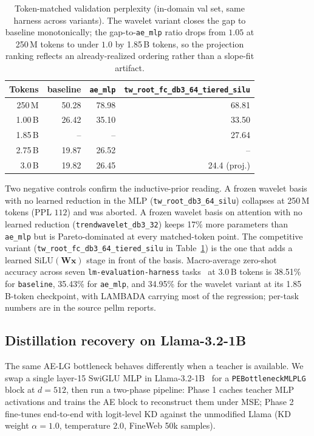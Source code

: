 \documentclass{article}
\begin{document}
\begin{table}[h]
  \caption{Token-matched validation perplexity (in-domain val set, same harness across variants). The wavelet variant closes the gap to baseline monotonically; the gap-to-\texttt{ae\_mlp} ratio drops from $1.05$ at 250\,M tokens to under $1.0$ by 1.85\,B tokens, so the projection ranking reflects an already-realized ordering rather than a slope-fit artifact.}
  \label{tab:llm_trajectory}
  \centering
  \begin{tabular}{rrrr}
    \toprule
    Tokens & baseline & \texttt{ae\_mlp} & \texttt{tw\_root\_fc\_db3\_64\_tiered\_silu} \\
    \midrule
    250\,M  & 50.28 & 78.98 & 68.81 \\
    1.00\,B & 26.42 & 35.10 & 33.50 \\
    1.85\,B & --    & --    & 27.64 \\
    2.75\,B & 19.87 & 26.52 & -- \\
    3.0\,B  & 19.82 & 26.45 & 24.4 (proj.) \\
    \bottomrule
  \end{tabular}
\end{table}

Two negative controls confirm the inductive-prior reading. A frozen wavelet basis with no learned reduction in the MLP (\texttt{tw\_root\_db3\_64\_silu}) collapses at 250\,M tokens (PPL $112$) and was aborted. A frozen wavelet basis on attention with no learned reduction (\texttt{trendwavelet\_db3\_32}) keeps 17\% more parameters than \texttt{ae\_mlp} but is Pareto-dominated at every matched-token point. The competitive variant (\texttt{tw\_root\_fc\_db3\_64\_tiered\_silu} in Table~\ref{tab:llm_trajectory}) is the one that adds a learned $\mathrm{SiLU}(\mathbf{W}\mathbf{x})$ stage in front of the basis. Macro-average zero-shot accuracy across seven \texttt{lm-evaluation-harness} tasks~\citep{eval-harness} at 3.0\,B tokens is 38.51\% for \texttt{baseline}, 35.43\% for \texttt{ae\_mlp}, and 34.95\% for the wavelet variant at its 1.85\,B-token checkpoint, with LAMBADA carrying most of the regression; per-task numbers are in the source pellm reports.

\subsection{Distillation recovery on Llama-3.2-1B}

The same AE-LG bottleneck behaves differently when a teacher is available. We swap a single layer-15 SwiGLU MLP in Llama-3.2-1B~\citep{llama32} for a \texttt{PEBottleneckMLPLG} block at $d=512$, then run a two-phase pipeline: Phase 1 caches teacher MLP activations and trains the AE block to reconstruct them under MSE; Phase 2 fine-tunes end-to-end with logit-level KD against the unmodified Llama (KD weight $\alpha=1.0$, temperature $2.0$, FineWeb 50k samples).
\end{document}
